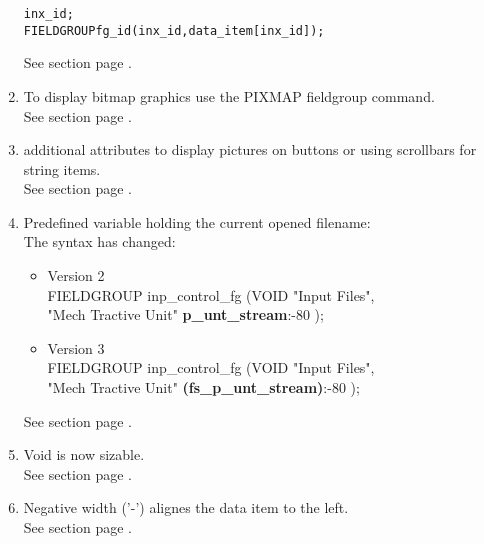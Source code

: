 \begin{enumerate}
\begin{boxedminipage}[t]{\linewidth}
\begin{alltt}
  \INDEX inx_id;
  FIELDGROUP fg_id ( inx_id, data_item[inx_id] );
\end{alltt}
\end{boxedminipage}

See section  page \pageref{sec:uiindex}. \\
\item To display bitmap graphics use the PIXMAP fieldgroup command. \\
See section  page \pageref{sec:uifieldgroup}. \\
\item additional attributes to display pictures on buttons or using scrollbars for string items. \\
See section  page \pageref{sec:uifieldgroup}. \\
\item Predefined variable holding the current opened filename: \\
The syntax has changed:
\begin{itemize}
\item Version 2 \\
FIELDGROUP inp\_control\_fg (VOID "Input Files", \\
"Mech Tractive Unit" {\bfseries p\_unt\_stream}:-80 ); \\
\item Version 3 \\
FIELDGROUP inp\_control\_fg (VOID "Input Files", \\
"Mech Tractive Unit" {\bfseries \FILENAME (fs\_p\_unt\_stream)}:-80 ); \\
\end{itemize}
See section  page \pageref{dia:uifielddatareference}. \\
\item Void is now sizable. \\
See section  page \pageref{sec:uifieldgroup}. \\
\item Negative width ('-') alignes the data item to the left. \\
See section  page \pageref{dia:uifieldattributes}. \\

\end{enumerate}
